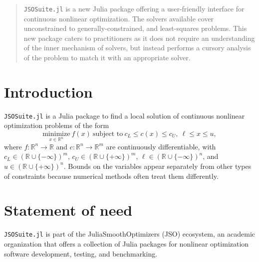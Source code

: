 \documentclass{juliacon}
\begin{document}


\maketitle

\begin{abstract}

\texttt{JSOSuite.jl} is a new Julia package offering a user-friendly interface for continuous nonlinear optimization.
The solvers available cover unconstrained to generally-constrained, and least-squares problems.
This new package caters to practitioners as it does not require an understanding of the inner mechanism of solvers, but instead performs a cursory analysis of the problem to match it with an appropriate solver.

\end{abstract}

\section{Introduction}

\texttt{JSOSuite.jl} is a Julia \cite{bezanson2017julia} package to find a local solution of continuous nonlinear optimization problems of the form
\begin{equation}\label{eq:nlp}
    \underset{x \in \mathbb{R}^{n}}{\text{minimize}} \ f(x) \ \text{subject to} \ c_L \leq c(x)  \leq c_U, \ \ell \leq x \leq u,
\end{equation}
where \(f:\mathbb{R}^n\to\mathbb{R}\) and  \(c:\mathbb{R}^n\to\mathbb{R}^m\) are continuously differentiable, with \(c_L \in \left(\mathbb{R} \cup \{-\infty\} \right)^{m}\),  \(c_U \in \left(\mathbb{R} \cup \{+\infty\} \right)^{m}\),  \(\ell \in \left(\mathbb{R} \cup \{-\infty\} \right)^n\), and  \(u \in \left(\mathbb{R} \cup \{+\infty\} \right)^n\).
Bounds on the variables appear separately from other types of constraints because numerical methods often treat them differently.

\section{Statement of need}

\texttt{JSOSuite.jl} is part of the JuliaSmoothOptimizers (JSO) ecosystem, an academic organization that offers a collection of Julia packages for nonlinear optimization software development, testing, and benchmarking.
\end{document}

